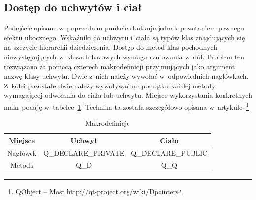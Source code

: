 \subsection{Dostęp do uchwytów i ciał}
Podejście opisane w~poprzednim punkcie skutkuje jednak powstaniem pewnego efektu ubocznego.
Wskaźniki do uchwytu i~ciała są typów klas znajdujących się na szczycie hierarchii dziedziczenia. Dostęp do metod klas pochodnych niewystępujących w~klasach bazowych wymaga rzutowania w~dół. 
Problem ten rozwiązano za pomocą czterech makrodefinicji przyjmujących jako argument nazwę klasy uchwytu. Dwie z~nich należy wywołać w~odpowiednich nagłówkach. Z~kolei pozostałe dwie należy wywoływać na początku każdej metody wymagającej odwołania do ciała lub uchwytu. Miejsce wykorzystania konkretnych makr podaję w~tabelce~\ref{tab:makra}. Technika ta została szczegółowo opisana w~artykule~\footnote{QObject -- Most \url{http://qt-project.org/wiki/Dpointer}}

\begin{table}[h]\footnotesize
\centering
\caption{Makrodefinicje}
\label{tab:makra}
\begin{tabular}{|c|c|c|}
\hline
Miejsce & Uchwyt & Ciało\\
\hline
Nagłówek & Q\_DECLARE\_PRIVATE & Q\_DECLARE\_PUBLIC\\
\hline
Metoda & Q\_D & Q\_Q\\
\hline
\end{tabular}
\end{table}
